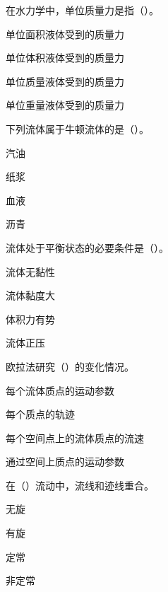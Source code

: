 \begin{ti}

\item 在水力学中，单位质量力是指（\quad）。
\begin{choices}
\item 单位面积液体受到的质量力
\item 单位体积液体受到的质量力
\item 单位质量液体受到的质量力
\item 单位重量液体受到的质量力
\end{choices}

\item 下列流体属于牛顿流体的是（\quad）。
\begin{choices}
\item 汽油
\item 纸浆
\item 血液
\item 沥青
\end{choices}

\item 流体处于平衡状态的必要条件是（\quad）。
\begin{choices}
\item 流体无黏性
\item 流体黏度大
\item 体积力有势
\item 流体正压
\end{choices}

\item 欧拉法研究（\quad）的变化情况。
\begin{choices}
\item 每个流体质点的运动参数
\item 每个质点的轨迹
\item 每个空间点上的流体质点的流速
\item 通过空间上质点的运动参数
\end{choices}

\item 在（\quad）流动中，流线和迹线重合。
\begin{choices}
\item 无旋
\item 有旋
\item 定常
\item 非定常
\end{choices}


\end{ti}
